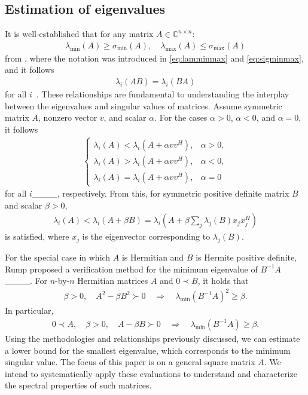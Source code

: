\subsection{Estimation of eigenvalues}

It is well-established that for any matrix $A \in \mathbb{C}^{n \times n}$:
\begin{align}
\lambda_{\min}(A) \geq \sigma_{\min}(A),\quad \lambda_{\max}(A) \leq \sigma_{\max}(A)\label{eq:eig1}
\end{align}
from \cite[Theorem~5.6.9]{horn2012matrix}, where the notation was introduced in \eqref{eq:lamminmax} and \eqref{eq:sigminmax}, and it follows
\begin{align}
\lambda_{i}(AB) = \lambda_{i}(BA)\label{eq:eig2}
\end{align}
for all $i$~\cite[p. 55]{horn2012matrix}. 
These relationships are fundamental to understanding the interplay between the eigenvalues and singular values of matrices.
Assume symmetric matrix $A$, nonzero vector $v$, and scalar $\alpha$. 
For the cases $\alpha>0$, $\alpha<0$, and $\alpha=0$, it follows
\begin{align}
    \begin{cases}
        \lambda_i(A)<\lambda_i(A+\alpha vv^H), & \alpha>0,\\
        \lambda_i(A)>\lambda_i(A+\alpha vv^H), & \alpha<0,\\
        \lambda_i(A)=\lambda_i(A+\alpha vv^H), & \alpha=0
    \end{cases}
\end{align}
for all $i$____, respectively.
From this, for symmetric positive definite matrix $B$ and scalar $\beta>0$,
\begin{align}
    \lambda_i(A)<\lambda_i(A+\beta B)=\lambda_i\left(A+\beta\sum_j\lambda_j(B)x_jx_j^H\right)
\end{align}
is satisfied, where $x_j$ is the eigenvector corresponding to $\lambda_j(B)$.

For the special case in which $A$ is Hermitian and $B$ is Hermite positive definite, Rump proposed a verification method for the minimum eigenvalue of $B^{-1}A$____.
For $n$-by-$n$ Hermitian matrices $A$ and $0\prec B$, it holds that
\begin{align}
    \beta>0,\quad A^2-\beta B^2\succ 0 \quad \Longrightarrow \quad  \lambda_{\min}(B^{-1}A)^2\geq \beta.\label{eq:mineig2}
\end{align}
In particular,
\begin{align}
    0\prec A,\quad \beta>0,\quad A-\beta B\succ 0 \quad \Longrightarrow \quad  \lambda_{\min}(B^{-1}A)\geq \beta.\label{eq:mineig}
\end{align}
Using the methodologies and relationships previously discussed, we can estimate a lower bound for the smallest eigenvalue, which corresponds to the minimum singular value. The focus of this paper is on a general square matrix $A$. We intend to systematically apply these evaluations to understand and characterize the spectral properties of such matrices.




